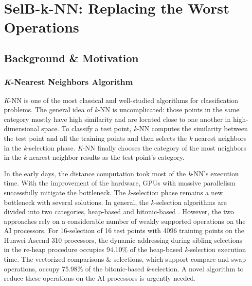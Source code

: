\documentclass[12pt]{extbook}
\begin{document}

\chapter{SelB-k-NN: Replacing the Worst Operations}
\label{sec_3}

\section{Background \& Motivation}

\subsection{\textit{K}-Nearest Neighbors Algorithm}

\textit{K}-NN is one of the most classical and well-studied algorithms for classification problems. The general idea of \textit{k}-NN is uncomplicated: those points in the same category mostly have high similarity and are located close to one another in high-dimensional space. To classify a test point, \textit{k}-NN computes the similarity between the test point and all the training points and then selects the \textit{k} nearest neighbors in the \textit{k}-selection phase. \textit{K}-NN finally chooses the category of the most neighbors in the \textit{k} nearest neighbor results as the test point's category.

In the early days, the distance computation took most of the \textit{k}-NN's execution time. With the improvement of the hardware, GPUs with massive parallelism successfully mitigate the bottleneck. The \textit{k}-selection phase remains a new bottleneck with several solutions. In general, the \textit{k}-selection algorithms are divided into two categories, heap-based \cite{DBLP:conf/medi/VelentzasVC21, DBLP:conf/sigmod/ShanbhagPM18, DBLP:conf/ccgrid/KatoH10, DBLP:journals/concurrency/KatoH12, DBLP:conf/icip/GarciaDNB10, DBLP:conf/egh/LiSPAOA12} and bitonic-based \cite{DBLP:conf/sigmod/ShanbhagPM18, DBLP:journals/tbd/JohnsonDJ21, DBLP:conf/ipps/Tang0EMG15}. However, the two approaches rely on a considerable number of weakly supported operations on the AI processors. For 16-selection of 16 test points with 4096 training points on the Huawei Ascend 310 processors, the dynamic addressing during sibling selections in the re-heap procedure occupies 94.10\% of the heap-based \textit{k}-selection execution time. The vectorized comparisons \& selections, which support compare-and-swap operations, occupy 75.98\% of the bitonic-based \textit{k}-selection. A novel algorithm to reduce these operations on the AI processors is urgently needed.
\end{document}
